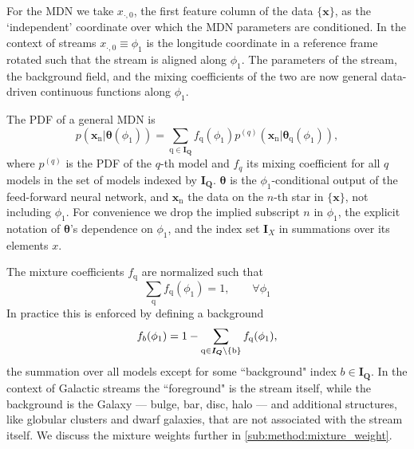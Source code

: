 \documentclass[twocolumn, linenumbers]{aastex631}
\newcommand{\mrm}[1]{\mathrm{#1}}
\newcommand{\mbs}[1]{\boldsymbol{#1}}
\newcommand{\mbf}[1]{\mathbf{#1}}
\newcommand{\pdf}{p}
\newcommand{\nth}[1]{{#1}_{\mrm{n}}}  %
\newcommand{\qth}[1]{{#1}_{\mrm{q}}}  %
\newcommand{\smallcomponent}[2]{#2^{\scriptscriptstyle (#1)}}
\newcommand{\cmp}[2]{\smallcomponent{#1}{#2}}
\begin{document}
        For the MDN we take $x_{\cdot, 0}$, the first feature column of the data
        $\{\mbf{x}\}$, as the `independent' coordinate over which the MDN
        parameters are conditioned. In the context of streams $x_{\cdot, 0}
        \equiv \phi_1$ is the longitude coordinate in a reference frame rotated
        such that the stream is aligned along $\phi_1$. The parameters of the
        stream, the background field, and the mixing coefficients of the two are
        now general data-driven continuous functions along $\phi_1$.

        The PDF of a general MDN is
        \begin{equation} \label{eq:general_mixture_network}
            \!\!\! \pdf(\nth{\mbs{x}} | \mbs{\theta}(\phi_1))
            \!=\! \sum_{\mrm{q} \in \mbs{I_Q}} \! \qth{f}(\phi_1) \cmp{q}{\pdf}\left(\nth{\mbs{x}}|\qth{\mbs{\theta}}(\phi_1)\right),
        \end{equation}
        where $\cmp{q}{\pdf}$ is the PDF of the $q$-th model and $f_q$ its
        mixing coefficient for all $q$ models in the set of models indexed by
        $\mbs{I_Q}$. $\mbs{\theta}$ is the $\phi_1$-conditional output of the
        feed-forward neural network, and $\nth{\mbs{x}}$ the data on the $n$-th
        star in $\{\mbs{x}\}$, not including $\phi_1$. For convenience we drop
        the implied subscript $n$ in $\phi_1$, the explicit notation of
        $\mbs{\theta}$'s dependence on $\phi_1$, and the index set $\mbs{I}_X$
        in summations over its elements $x$.

        The mixture coefficients $\qth{f}$ are normalized such that
        \begin{equation} \label{eq:mixture_weight_sum}
            \sum_{\mrm{q}} \qth{f}(\phi_1) = 1, \qquad \forall \phi_1
        \end{equation}
        In practice this is enforced by defining a background
        \begin{equation} \label{eq:mixture_weight_normalization}
            f_{b}(\phi_1) = 1 - \sum_{\rm{q}\in \mbs{I_Q}\backslash \{b\}} \qth{f}(\phi_1),
        \end{equation}
        the summation over all models except for some ``background" index $b \in
        \mbs{I_Q}$.  In the context of Galactic streams the ``foreground" is the
        stream itself, while the background is the Galaxy --- bulge, bar, disc,
        halo --- and additional structures, like globular clusters and dwarf
        galaxies, that are not associated with the stream itself.  We discuss
        the mixture weights further in \autoref{sub:method:mixture_weight}.
\end{document}
